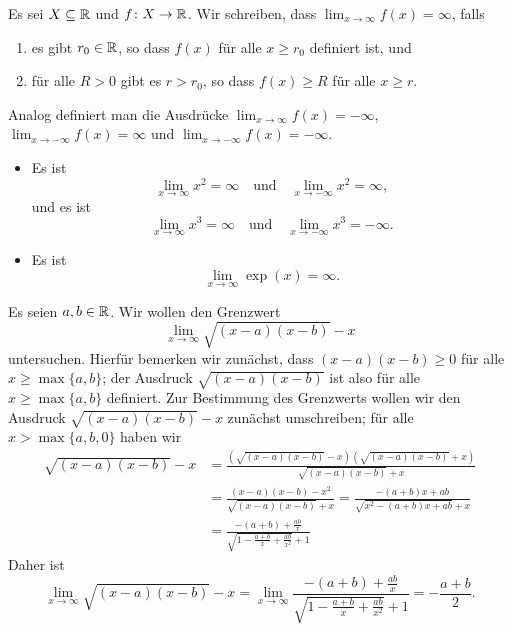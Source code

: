 \documentclass[a4paper,10pt]{article}
\begin{document}
\begin{defi}
 Es sei $X \subseteq \mathbb{R}$ und $f \colon X \to \mathbb{R}$. Wir schreiben, dass $\lim_{x \to \infty} f(x) = \infty$, falls
 \begin{enumerate}
  \item
   es gibt $r_0 \in \mathbb{R}$, so dass $f(x)$ für alle $x \geq r_0$ definiert ist, und
  \item
   für alle $R > 0$ gibt es $r > r_0$, so dass $f(x) \geq R$ für alle $x \geq r$.
 \end{enumerate}
 Analog definiert man die Ausdrücke $\lim_{x \to \infty} f(x) = -\infty$, $\lim_{x \to -\infty} f(x) = \infty$ und $\lim_{x \to -\infty} f(x) = -\infty$. 
\end{defi}


\begin{bsp}
 \begin{itemize}
  \item
   Es ist
   \[
    \lim_{x \to \infty} x^2 = \infty
    \quad
    \text{und}
    \quad
    \lim_{x \to -\infty} x^2 = \infty,
   \]
   und es ist
   \[
    \lim_{x \to \infty} x^3 = \infty
    \quad
    \text{und}
    \quad
    \lim_{x \to -\infty} x^3 = -\infty.
   \]
  \item
   Es ist
   \[
    \lim_{x \to \infty} \exp(x) = \infty.
   \]
 \end{itemize}
\end{bsp}

\begin{bsp}
 Es seien $a,b \in \mathbb{R}$. Wir wollen den Grenzwert 
 \[
  \lim_{x \to \infty} \sqrt{(x-a)(x-b)}-x
 \]
 untersuchen. Hierfür bemerken wir zunächst, dass $(x-a)(x-b) \geq 0$ für alle \mbox{$x \geq \max\{a,b\}$}; der Ausdruck $\sqrt{(x-a)(x-b)}$ ist also für alle $x \geq \max\{a,b\}$ definiert. Zur Bestimmung des Grenzwerts wollen wir den Ausdruck $\sqrt{(x-a)(x-b)}-x$ zunächst umschreiben; für alle $x > \max\{a,b,0\}$ haben wir
 \begin{align*}
  \sqrt{(x-a)(x-b)}-x
  &= \frac{(\sqrt{(x-a)(x-b)}-x)(\sqrt{(x-a)(x-b)}+x)}{\sqrt{(x-a)(x-b)}+x} \\
  &= \frac{(x-a)(x-b)-x^2}{\sqrt{(x-a)(x-b)}+x}
  = \frac{-(a+b)x + ab}{\sqrt{x^2-(a+b)x+ab}+x} \\
  &= \frac{-(a+b)+\frac{ab}{x}}{\sqrt{1-\frac{a+b}{x}+\frac{ab}{x^2}}+1}
 \end{align*}
 Daher ist
 \[
  \lim_{x \to \infty} \sqrt{(x-a)(x-b)}-x
  = \lim_{x \to \infty} \frac{-(a+b)+\frac{ab}{x}}{\sqrt{1-\frac{a+b}{x}+\frac{ab}{x^2}}+1}
  = -\frac{a+b}{2}.
 \]
\end{bsp}
\end{document}
